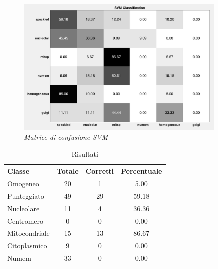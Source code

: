 \begin{figure}[H] 
  \centering
    \includegraphics[width=0.9\textwidth]{images/conf_mat_2014_svm.png}
    \caption{{\small \textit{Matrice di confusione SVM}}}
    \label{fig:2014svm}
\end{figure}

\begin{table}[H]
\centering
\footnotesize
\begin{tabular}{|l | c | c | c |} 
 \hline 
 \textbf{Classe} &  \textbf{Totale} & \textbf{Corretti} & \textbf{Percentuale} \\ [0.5ex] 
 \hline\hline
 Omogeneo & 20 & 1 & 5.00\\
 Punteggiato & 49 & 29 & 59.18\\
 Nucleolare & 11 & 4 & 36.36\\
 Centromero & 0 & 0 & 0.00\\
 Mitocondriale & 15 & 13 & 86.67\\
 Citoplasmico & 9 & 0 & 0.00\\
 Numem & 33 & 0 & 0.00\\
 \hline
\end{tabular}
\caption{Risultati}
\label{table:2014ressvm}
\end{table}


